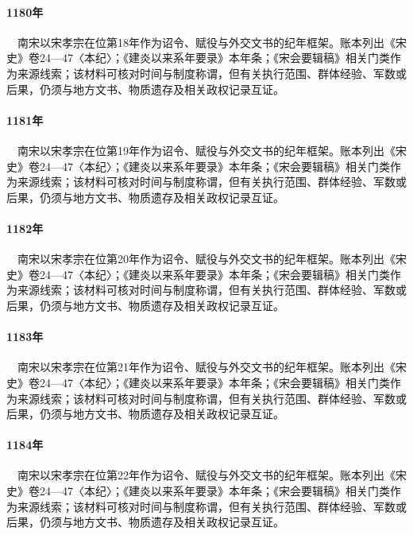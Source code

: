 \paragraph{1180年}　南宋以宋孝宗在位第18年作为诏令、赋役与外交文书的纪年框架。账本列出《宋史》卷24—47〈本纪〉；《建炎以来系年要录》本年条；《宋会要辑稿》相关门类作为来源线索；该材料可核对时间与制度称谓，但有关执行范围、群体经验、军数或后果，仍须与地方文书、物质遗存及相关政权记录互证。

\paragraph{1181年}　南宋以宋孝宗在位第19年作为诏令、赋役与外交文书的纪年框架。账本列出《宋史》卷24—47〈本纪〉；《建炎以来系年要录》本年条；《宋会要辑稿》相关门类作为来源线索；该材料可核对时间与制度称谓，但有关执行范围、群体经验、军数或后果，仍须与地方文书、物质遗存及相关政权记录互证。

\paragraph{1182年}　南宋以宋孝宗在位第20年作为诏令、赋役与外交文书的纪年框架。账本列出《宋史》卷24—47〈本纪〉；《建炎以来系年要录》本年条；《宋会要辑稿》相关门类作为来源线索；该材料可核对时间与制度称谓，但有关执行范围、群体经验、军数或后果，仍须与地方文书、物质遗存及相关政权记录互证。

\paragraph{1183年}　南宋以宋孝宗在位第21年作为诏令、赋役与外交文书的纪年框架。账本列出《宋史》卷24—47〈本纪〉；《建炎以来系年要录》本年条；《宋会要辑稿》相关门类作为来源线索；该材料可核对时间与制度称谓，但有关执行范围、群体经验、军数或后果，仍须与地方文书、物质遗存及相关政权记录互证。

\paragraph{1184年}　南宋以宋孝宗在位第22年作为诏令、赋役与外交文书的纪年框架。账本列出《宋史》卷24—47〈本纪〉；《建炎以来系年要录》本年条；《宋会要辑稿》相关门类作为来源线索；该材料可核对时间与制度称谓，但有关执行范围、群体经验、军数或后果，仍须与地方文书、物质遗存及相关政权记录互证。

